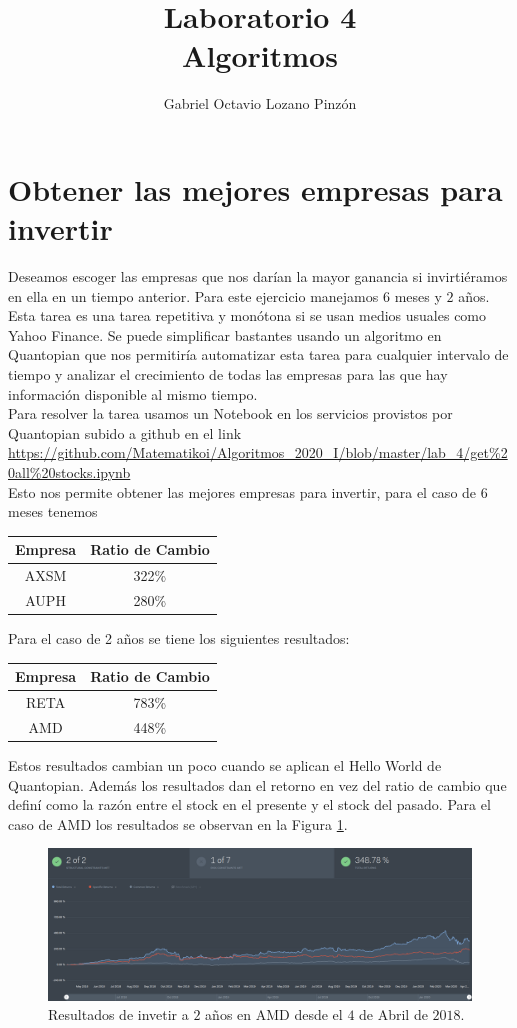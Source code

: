 \documentclass[10pt,a4paper,twocolumn]{article}
\title{Laboratorio 4\\Algoritmos}
\author{Gabriel Octavio Lozano Pinzón}
\begin{document}
	\maketitle
	\section{Obtener las mejores empresas para invertir}	
	Deseamos escoger las empresas que nos darían la mayor ganancia si invirtiéramos en ella en un tiempo anterior. Para este ejercicio manejamos $6$ meses y $2$ años. Esta tarea es una tarea repetitiva y monótona si se usan medios usuales como Yahoo Finance. Se puede simplificar bastantes usando un algoritmo en Quantopian que nos permitiría automatizar esta tarea para cualquier intervalo de tiempo y analizar el crecimiento de todas las empresas para las que hay información disponible al mismo tiempo.\\
	Para resolver la tarea usamos un Notebook en los servicios provistos por Quantopian subido a github en el link \url{https://github.com/Matematikoi/Algoritmos_2020_I/blob/master/lab_4/get%20all%20stocks.ipynb}\\
		Esto nos permite obtener las mejores empresas para invertir, para el caso de 6 meses tenemos
		\begin{center}
			\begin{tabular}{ |c|c| } 
				\hline
				Empresa & Ratio de Cambio\\
				\hline
				AXSM & 322\%\\ 
				AUPH & 280\%\\ 
				\hline
			\end{tabular}
		\end{center}
		Para el caso de 2 años se tiene los siguientes resultados: 
		\begin{center}
			\begin{tabular}{ |c|c| } 
				\hline
				Empresa & Ratio de Cambio\\
				\hline
				RETA & 783\%\\ 
				AMD & 448\%\\ 
				\hline
			\end{tabular}
		\end{center}
		Estos resultados cambian un poco cuando se aplican el Hello World de Quantopian. Además los resultados dan el retorno en vez del ratio de cambio que definí como la razón entre el stock en el presente y el stock del pasado. Para el caso de AMD los resultados se observan en la Figura \ref{fig:amd}.
		\begin{figure}
			\centering
			\includegraphics[width=1.0\linewidth]{amd.png}
			\caption{Resultados de invetir a $2$ años en AMD desde el $4$ de Abril de $2018$.}
			\label{fig:amd}
		\end{figure}
\end{document}
